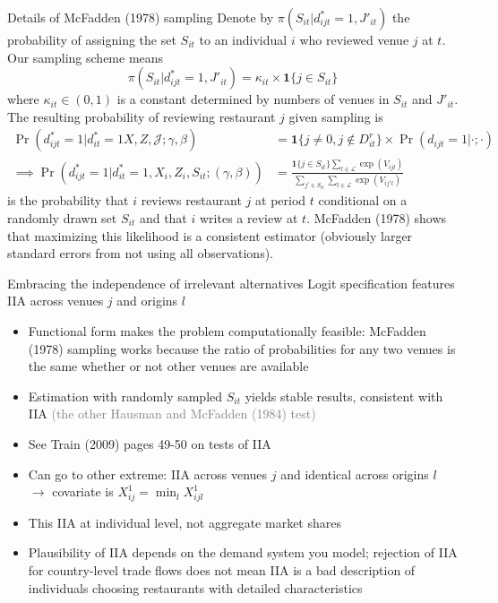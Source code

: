 \documentclass[11pt,notes=hide,aspectratio=169]{beamer}
\begin{document}
\begin{frame}{Details of McFadden (1978) sampling}
Denote by $\pi(S_{it}|d_{ijt}^{*}=1,J'_{it})$ the probability of assigning the set $S_{it}$ to an individual $i$ who reviewed venue $j$ at $t$. Our sampling scheme means
$$
\pi(S_{it}|d_{ijt}^{*}=1,J'_{it})
=
\kappa_{it} \times \mathbf{1}\{j\in S_{it}\}
$$
where $\kappa_{it}\in(0,1)$ is a constant determined by numbers of venues in  $S_{it}$ and $J'_{it}$.
The resulting probability of reviewing restaurant $j$ given sampling is
\begin{align*}
\Pr(d_{ijt}^{*}=1|d_{it}^{*}=1X,Z,\mathcal{J};\gamma,\beta)	
&=
\mathbf{1}\{j\neq 0,j\notin D_{it}^{r}\} \times \Pr(d_{ijt}=1|\cdot;\cdot)
\\
\implies
\Pr(d_{ijt}^{*}=1|d_{it}^{*}=1,X_{i},Z_{i},S_{it};(\gamma,\beta))
&=
\frac{\mathbf{1}\{j\in S_{it}\}\sum_{l\in\mathcal{L}}\exp(V_{ijl})}{\sum_{j'\in S_{it}}\sum_{l\in\mathcal{L}}\exp(V_{ij'l})}
\end{align*}
is the probability that $i$ reviews restaurant $j$ at period $t$ conditional on a randomly drawn set $S_{it}$ and that $i$ writes a review at $t$.
McFadden (1978) shows that maximizing this likelihood is a consistent estimator (obviously larger standard errors from not using all observations).
\end{frame}
\begin{frame}{Embracing the independence of irrelevant alternatives}
Logit specification features IIA across venues $j$ and origins $l$
\begin{itemize}
	\item Functional form makes the problem computationally feasible:
	McFadden (1978) sampling works because the ratio of probabilities for any two venues is the same whether or not other venues are available
	\item Estimation with randomly sampled $S_{it}$ yields stable results, consistent with IIA
	\textcolor{gray}{(the other Hausman and McFadden (1984) test)}
	\item See Train (2009) pages 49-50 on tests of IIA
	\item Can go to other extreme: IIA across venues $j$ and identical across origins $l$ $\to$ covariate is $X_{ij}^{1} = \min_{l} X_{ijl}^{1}$
	\item This IIA at individual level, not aggregate market shares
	\item Plausibility of IIA depends on the demand system you model;
	rejection of IIA for country-level trade flows does not mean IIA is a bad description of individuals choosing restaurants with detailed characteristics
\end{itemize}
\end{frame}
\end{document}
